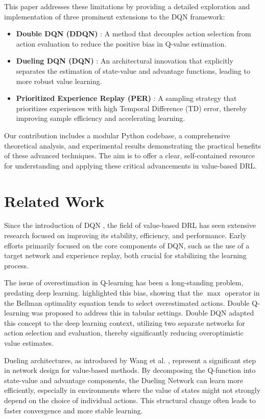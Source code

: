 \documentclass[conference]{IEEEtran}
\begin{document}
This paper addresses these limitations by providing a detailed exploration and implementation of three prominent extensions to the DQN framework:
\begin{itemize}
    \item \textbf{Double DQN (DDQN)} \cite{vanhasselt2016deep}: A method that decouples action selection from action evaluation to reduce the positive bias in Q-value estimation.
    \item \textbf{Dueling DQN (DQN)} \cite{wang2016dueling}: An architectural innovation that explicitly separates the estimation of state-value and advantage functions, leading to more robust value learning.
    \item \textbf{Prioritized Experience Replay (PER)} \cite{schaul2015prioritized}: A sampling strategy that prioritizes experiences with high Temporal Difference (TD) error, thereby improving sample efficiency and accelerating learning.
\end{itemize}

Our contribution includes a modular Python codebase, a comprehensive theoretical analysis, and experimental results demonstrating the practical benefits of these advanced techniques. The aim is to offer a clear, self-contained resource for understanding and applying these critical advancements in value-based DRL.

\section{Related Work}
Since the introduction of DQN \cite{mnih2015human}, the field of value-based DRL has seen extensive research focused on improving its stability, efficiency, and performance. Early efforts primarily focused on the core components of DQN, such as the use of a target network and experience replay, both crucial for stabilizing the learning process.

The issue of overestimation in Q-learning has been a long-standing problem, predating deep learning. \cite{thrun1993issues} highlighted this bias, showing that the \(\max\) operator in the Bellman optimality equation tends to select overestimated actions. Double Q-learning \cite{hasselt2010double} was proposed to address this in tabular settings. Double DQN \cite{vanhasselt2016deep} adapted this concept to the deep learning context, utilizing two separate networks for action selection and evaluation, thereby significantly reducing overoptimistic value estimates.

Dueling architectures, as introduced by Wang et al. \cite{wang2016dueling}, represent a significant step in network design for value-based methods. By decomposing the Q-function into state-value and advantage components, the Dueling Network can learn more efficiently, especially in environments where the value of states might not strongly depend on the choice of individual actions. This structural change often leads to faster convergence and more stable learning.
\end{document}
